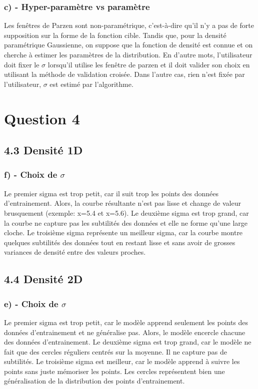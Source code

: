 \documentclass[12pt]{article}
\begin{document}
\subsubsection{c) - Hyper-paramètre vs paramètre}
Les fenêtres de Parzen sont non-paramétrique, c'est-à-dire qu'il n'y a pas de forte supposition sur la forme de la fonction cible. Tandis que, pour la densité paramétrique Gaussienne, on suppose que la fonction de densité est connue et on cherche à estimer les paramètres de la distribution. En d'autre mots, l'utilisateur doit fixer le $\sigma$ lorsqu'il utilise les fenêtre de parzen et il doit valider son choix en utilisant la méthode de validation croisée. Dans l'autre cas, rien n'est fixée par l'utilisateur,  $\sigma$ est estimé par l'algorithme.
\\

\section{Question 4}
\subsection{4.3 Densité 1D}
\subsubsection{f) - Choix de $\sigma$}
Le premier sigma est trop petit, car il suit trop les points des données d'entrainement.
Alors, la courbe résultante n'est pas lisse et change de valeur brusquement (exemple: x=5.4 et x=5.6).
Le deuxième sigma est trop grand, car la courbe ne capture pas les subtilités des données et elle ne forme qu'une large cloche.
Le troisième sigma représente un meilleur sigma, car la courbe montre quelques subtilités des données tout en restant lisse
et sans avoir de grosses variances de densité entre des valeurs proches.

\subsection{4.4 Densité 2D}
\subsubsection{e) - Choix de $\sigma$}
Le premier sigma est trop petit, car le modèle apprend seulement les points des données d'entrainement et ne généralise pas.
Alors, le modèle encercle chacune des données d'entrainement.
Le deuxième sigma est trop grand, car le modèle ne fait que des cercles réguliers centrés sur la moyenne. Il ne capture pas
de subtilités.
Le troisième sigma est meilleur, car le modèle apprend à suivre les points sans juste mémoriser les points. 
Les cercles représentent bien une généralisation de la distribution des points d'entrainement.
\end{document}
